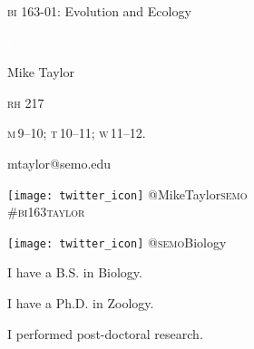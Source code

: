 \documentclass[t]{beamer}
\begin{document}
%
{
\begin{frame}[b]{\textcolor{orange7}{\textsc{bi} 163-01: Evolution and Ecology}}


\hfill\textcolor{white}{\tiny Fir0002, Wikimedia }
\end{frame}
}
%
{
\begin{frame}[t]
	\large
	\vspace{5ex}
	\hangpara\hspace{17em} Mike Taylor

	\hangpara\hspace{17em} \textsc{rh} 217

	\hangpara\hspace{17em} \textsc{m}\,9--10; \textsc{t}\,10--11; \textsc{w}\,11--12.

	\hangpara\hspace{17em} mtaylor@semo.edu
	
	\hangpara \hspace{17em} \texttt{[image: twitter\_icon]} @MikeTaylor\textsc{semo}\\
	\hspace{17em} \#\textsc{bi}163\textsc{taylor}

	\hangpara \hspace{17em} \texttt{[image: twitter\_icon]} @\textsc{semo}Biology\\
\end{frame}
}
%
{
\begin{frame}[t]{I have a B.S. in Biology.}
		
\end{frame}
}
%
{
	\begin{frame}[t]{I have a Ph.D. in Zoology.}
		
	\end{frame}
}
%
{
	\begin{frame}[t]{I performed post-doctoral research.}
		
	\end{frame}
}
\end{document}

